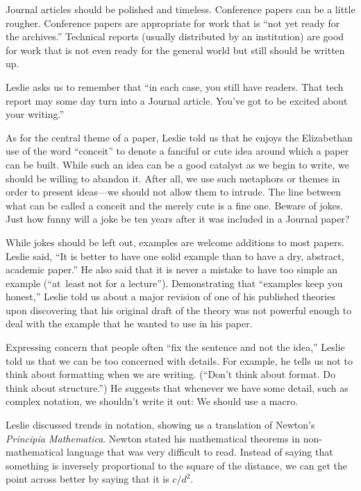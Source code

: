 Journal articles should be polished and timeless.  Conference papers
can be a little rougher.  Conference papers are appropriate for work
that is ``not yet ready for the archives.''  Technical reports (usually
distributed by an institution) are good for work that is not even ready
for the general world but still should be written up.

Leslie asks us to remember that ``in each case, you still have readers.
That tech report may some day turn into a Journal article. You've got
to be excited about your writing.''

As for the central theme of a paper, Leslie told us that he enjoys the
Elizabethan use of the word ``conceit'' to denote a fanciful or cute idea
around which a paper can be built.  While such an idea can be a good
catalyst as we begin to write, we should be willing to abandon it.
After all, we use such metaphors or themes in order to present
ideas---we should not allow them to intrude.  The line between what
 can be called a conceit and the merely cute is a fine one.  Beware
of jokes.  Just how funny will a joke be ten years after it was
included in a Journal paper?

While jokes should be left out, examples are welcome additions to most
papers.  Leslie said, ``It is better to have one solid example than to have
a dry, abstract, academic paper.''  He also said that it is never a mistake
to have too simple an example (``at~least not for a lecture'').  Demonstrating
that ``examples keep you honest,'' Leslie told us about a major revision of
one of his published theories upon discovering that his original draft
of the theory was not
powerful enough to deal with the example that he wanted to use in his
paper.

Expressing concern that people often ``fix 
the sentence and not the idea,'' Leslie
told us that we can be too concerned with details.  For example, he tells
us not to think about formatting when we are writing.  (``Don't think about
format.  Do think about structure.'')  He suggests that whenever we have
some detail, such as complex notation, we shouldn't write it out: We
should use a macro.

Leslie discussed trends in notation, showing us a translation of
Newton's {\sl Principia Mathematica}.  Newton stated his mathematical
theorems in
non-mathematical language that was  very difficult to read. 
Instead of saying that something is inversely proportional to the
square of the distance, we can get the point across better by saying that it
is $c/d^2$.

